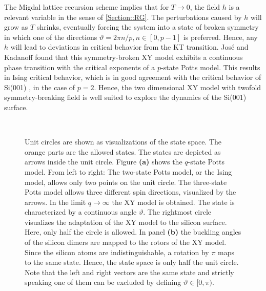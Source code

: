 	The Migdal lattice recursion scheme \cite{migdal1975phase} implies that for $T \rightarrow 0$, the field $h$ is a relevant variable in the sense of \autoref{Section::RG}. The perturbations caused by $h$ will grow as $T$ shrinks, eventually forcing the system into a state of broken symmetry in which one of the directions $\vartheta =	{2 \pi n }/{p}, n \in \left[0, p-1\right]$ is preferred. Hence, any $h$ will lead to deviations in critical behavior from the KT transition. José and Kadanoff \cite{jose1977renormalization} found that this symmetry-broken XY model exhibits a continuous phase transition with the critical exponents of a $p$-state Potts model. This results in Ising critical behavior, which is in good agreement with the critical behavior of Si(001) \cite{brand2023critical}, in the case of $p=2$. Hence, the two dimensional XY model with twofold symmetry-breaking field is well suited to explore the dynamics of the Si(001) surface.
	\begin{figure}
		\centering
		\begin{subfigure}{\textwidth}
			\centering
			
		\end{subfigure} \\
		\par\bigskip %
		\begin{subfigure}{\textwidth}
			\centering
			
		\end{subfigure}
		\caption{Unit circles are shown as visualizations of the state space. The orange parts are the allowed states. The states are depicted as arrows inside the unit circle. Figure \textbf{(a)} shows the $q$-state Potts model. From left to right: The two-state Potts model, or the Ising model, allows only two points on the unit circle.  The three-state Potts model allows three different spin directions, visualized by the arrows. In the limit $q \rightarrow \infty$ the XY model is obtained. The state is characterized by a continuous angle $\vartheta$. The rightmost circle visualizes the adaptation of the XY model to the silicon surface. Here, only half the circle is allowed. In panel \textbf{(b)} the buckling angles of the silicon dimers are mapped to the rotors of the XY model. Since the silicon atoms are indistinguishable, a rotation by $\pi$ maps to the same state. Hence, the state space is only half the unit circle. Note that the left and right vectors are the same state and strictly speaking one of them can be excluded by defining $\vartheta \in [0, \pi)$.}
		\label{Fig::States}
	\end{figure}
